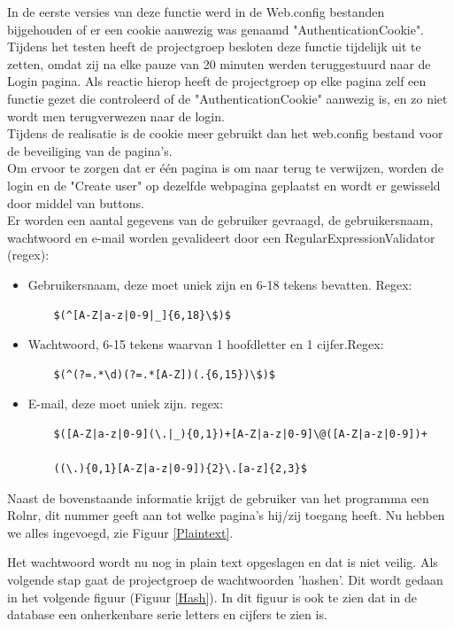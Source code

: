 \documentclass[11pt]{article}
\begin{document}
	
	In de eerste versies van deze functie werd in de Web.config bestanden bijgehouden of er een cookie aanwezig was genaamd "AuthenticationCookie". Tijdens het testen heeft de projectgroep besloten deze functie tijdelijk uit te zetten, omdat zij na elke pauze van 20 minuten werden teruggestuurd naar de Login pagina. Als reactie hierop heeft de projectgroep op elke pagina zelf een functie gezet die controleerd of de "AuthenticationCookie" aanwezig is, en zo niet wordt men terugverwezen naar de login.\\
	
	Tijdens de realisatie is de cookie meer gebruikt dan het web.config bestand voor de beveiliging van de pagina's.	\\
	
	Om ervoor te zorgen dat er één pagina is om naar terug te verwijzen, worden de login en de "Create user" op dezelfde webpagina geplaatst en wordt er gewisseld door middel van buttons.\\
	
	
	Er worden een aantal gegevens van de gebruiker gevraagd, de gebruikersnaam, wachtwoord en e-mail worden gevalideert door een RegularExpressionValidator (regex):
\begin{itemize}
	\item Gebruikersnaam, deze moet uniek zijn en 6-18 tekens bevatten. Regex: 
	\begin{verbatim}
	$(^[A-Z|a-z|0-9|_]{6,18}\$)$
	\end{verbatim}
	
	\item Wachtwoord, 6-15 tekens waarvan 1 hoofdletter en 1 cijfer.Regex:
	\begin{verbatim}
	$(^(?=.*\d)(?=.*[A-Z])(.{6,15})\$)$
	\end{verbatim}
	\item E-mail, deze moet uniek zijn. regex:
	\begin{verbatim}
	$([A-Z|a-z|0-9](\.|_){0,1})+[A-Z|a-z|0-9]\@([A-Z|a-z|0-9])+
	
	((\.){0,1}[A-Z|a-z|0-9]){2}\.[a-z]{2,3}$
	\end{verbatim}
\end{itemize}

Naast de bovenstaande informatie krijgt de gebruiker van het programma een Rolnr, dit nummer geeft aan tot welke pagina's hij/zij toegang heeft. Nu hebben we alles ingevoegd, zie Figuur \ref{Plaintext}.

Het wachtwoord wordt nu nog in plain text opgeslagen en dat is niet veilig. Als volgende stap gaat de projectgroep de wachtwoorden 'hashen'. Dit wordt gedaan in het volgende figuur (Figuur \ref{Hash}). In dit figuur is ook te zien dat in de database een onherkenbare serie letters en cijfers te zien is.
\end{document}

